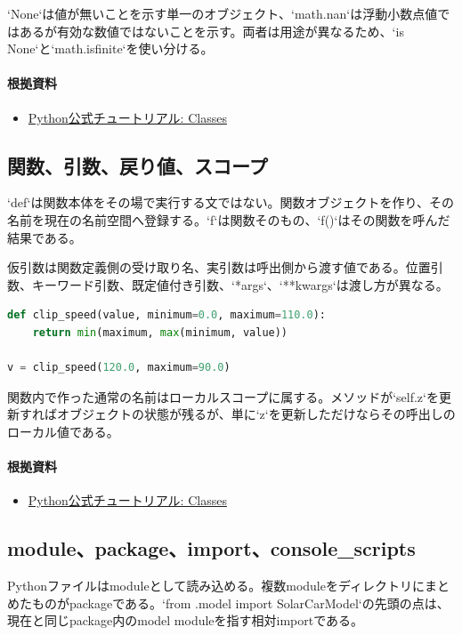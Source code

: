 \documentclass[a4paper,11pt]{article}
\begin{document}
`None`は値が無いことを示す単一のオブジェクト、`math.nan`は浮動小数点値ではあるが有効な数値ではないことを示す。両者は用途が異なるため、`is None`と`math.isfinite`を使い分ける。

\paragraph{根拠資料}
\begin{itemize}[leftmargin=1.6em]
\item \href{https://docs.python.org/3/tutorial/classes.html}{Python公式チュートリアル: Classes}
\end{itemize}

\subsection{関数、引数、戻り値、スコープ}
`def`は関数本体をその場で実行する文ではない。関数オブジェクトを作り、その名前を現在の名前空間へ登録する。`f`は関数そのもの、`f()`はその関数を呼んだ結果である。


仮引数は関数定義側の受け取り名、実引数は呼出側から渡す値である。位置引数、キーワード引数、既定値付き引数、`*args`、`**kwargs`は渡し方が異なる。


\begin{lstlisting}[language=python]
def clip_speed(value, minimum=0.0, maximum=110.0):
    return min(maximum, max(minimum, value))

v = clip_speed(120.0, maximum=90.0)
\end{lstlisting}


関数内で作った通常の名前はローカルスコープに属する。メソッドが`self.z`を更新すればオブジェクトの状態が残るが、単に`z`を更新しただけならその呼出しのローカル値である。

\paragraph{根拠資料}
\begin{itemize}[leftmargin=1.6em]
\item \href{https://docs.python.org/3/tutorial/classes.html}{Python公式チュートリアル: Classes}
\end{itemize}

\subsection{module、package、import、console\_scripts}
Pythonファイルはmoduleとして読み込める。複数moduleをディレクトリにまとめたものがpackageである。`from .model import SolarCarModel`の先頭の点は、現在と同じpackage内のmodel moduleを指す相対importである。
\end{document}
